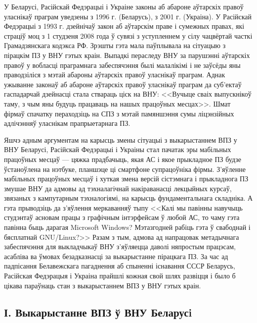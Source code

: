 \documentclass[10pt, a5paper]{article}
\begin{document}
У Беларусі, Расійскай Федэрацыі і Украіне законы аб абароне аўтарскіх правоў уласнікаў праграм уведзены з 1996 г. (Беларусь), з 2001 г. (Украіна). У Расійскай Федэрацыі з 1993 г. дзейнічаў закон аб аўтарскім праве і сумежных правах, які страціў моц з 1 студзеня 2008 года ў сувязі з уступленнем у сілу чацвёртай часткі Грамадзянскага кодэкса РФ. Зрэшты гэта мала паўплывала на сітуацыю з пірацкім ПЗ у ВНУ гэтых краін. Выпадкі пераследу ВНУ за парушэнні аўтарскіх правоў у вобласці праграмнага забеспячэння былі малалікімі і не заўсёды яны праводзіліся з мэтай абароны аўтарскіх правоў уласнікаў праграм. Аднак ужыванне законаў аб абароне аўтарскіх правоў уласнікаў праграм да суб'ектаў гаспадарчай дзейнасці стала ствараць ціск на ВНУ: <<Вучыце сваіх выпускнікоў таму, з чым яны будуць працаваць на нашых працоўных месцах>>. Шмат фірмаў спачатку пераходзіць на СПЗ з мэтай памяншэння сумы ліцэнзійных адлічэнняў уласнікам прапрыетарнага ПЗ.

Яшчэ адным аргументам на карысць змены сітуацыі з выкарыстаннем ВПЗ у ВНУ Беларусі, Расійскай Федэрацыі і Украіны стал пачатак эры мабільных працоўных месцаў --- цяжка прадбачыць, якая АС і якое прыкладное ПЗ будзе ўстаноўлена на нэтбуке, планшэце ці смартфоне супрацоўніка фірмы. З'яўленне мабільных працоўных месцаў і хуткая змена версій сістэмнага і прыкладнога ПЗ змушае ВНУ да адмовы ад тэхналагічнай накіраванасці лекцыйных курсаў, звязаных з кампутарным тэхналогіямі, на карысць фундаментальнага складніка. А гэта прыводзіць да з'яўлення меркаванняў тыпу <<Калі мы павінны навучыць студэнтаў асновам працы з графічным інтэрфейсам ў любой АС, то чаму гэта павінна быць дарагая Microsoft Windows? Мэтазгодней рабіць гэта ў свабоднай і бясплатнай GNU/Linux?>> Разам з тым, адмова ад напрацовак метадычнага забеспячэння для выкладчыкаў ВНУ з'яўляецца даволі няпростым працэсам, асабліва ва ўмовах безадказнасці за выкарыстанне пірацкага ПЗ. За час ад падпісання Белавежскага пагаднення аб спыненні існавання СССР Беларусь, Расійская Федэрацыя і Украіна прайшлі кожная свой шлях развіцця і было б цікава параўнаць стан з выкарыстаннем ВПЗ у ВНУ гэтых краін.

\subsection*{І. Выкарыстанне ВПЗ ў ВНУ Беларусi}
\end{document}
